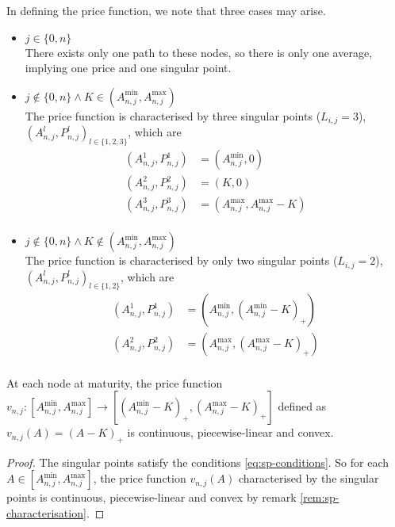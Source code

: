 In defining the price function, we note that three cases may arise.
\begin{itemize}
	\item $ j \in \{ 0, n \} $ \\
	There exists only one path to these nodes, so there is only one average, implying one price and one singular point.
	
	\item $ j \notin \{ 0, n \} \land K \in ( A_{n,j}^{\min}, A_{n,j}^{\max} ) $ \\	
	The price function is characterised by three singular points ($ L_{i,j} = 3 $), $ ( A_{n,j}^l , P_{n,j}^l )_{l \in \{ 1, 2, 3 \} } $, which are \\
	\begin{equation} \label{eq:sp-price-maturity-kin}
		\begin{aligned}
		( A_{n,j}^1 , P_{n,j}^1 ) &= ( A_{n,j}^{\min} , 0 ) \\
		( A_{n,j}^2 , P_{n,j}^2 ) &= ( K , 0 ) \\
		( A_{n,j}^3 , P_{n,j}^3 ) &= ( A_{n,j}^{\max} , A_{n,j}^{\max} - K ) \\
		\end{aligned}
	\end{equation} \label{eq:sp-price-maturity-kout}
	
	\item $ j \notin \{ 0, n \} \land K \notin ( A_{n,j}^{\min}, A_{n,j}^{\max} ) $ \\
	The price function is characterised by only two singular points ($ L_{i,j} = 2 $), $ ( A_{n,j}^l , P_{n,j}^l )_{l \in \{ 1, 2 \} } $, which are \\
	\begin{equation}
		\begin{aligned}
		( A_{n,j}^1 , P_{n,j}^1 ) &= ( A_{n,j}^{\min} , ( A_{n,j}^{\min} - K )_+ ) \\
		( A_{n,j}^2 , P_{n,j}^2 ) &= ( A_{n,j}^{\max} , ( A_{n,j}^{\max} - K )_+ ) \\
		\end{aligned}
	\end{equation}
\end{itemize}

\begin{lmm}
	At each node at maturity, the price function $ { v_{n,j}: \left[ A_{n,j}^{\min}, A_{n,j}^{\max} \right] \to \left[ ( A_{n,j}^{\min} - K )_+ , ( A_{n,j}^{\max} - K )_+ \right] } $ defined as $ v_{n,j}(A) = (A - K)_+ $ is continuous, piecewise-linear and convex.
\end{lmm}
\begin{proof}
	The singular points satisfy the conditions \ref{eq:sp-conditions}. So for each $ A \in \left[ A_{n,j}^{\min}, A_{n,j}^{\max} \right] $, the price function ${ v_{n,j}(A) }$ characterised by the singular points is continuous, piecewise-linear and convex by remark \ref{rem:sp-characterisation}.
\end{proof}



